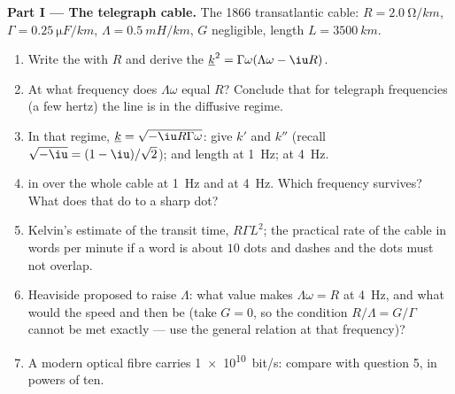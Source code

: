 \begin{problem}
\label{pb:b2:dispersion-wave-packets:1}

\medskip
\noindent\textbf{Part I --- The telegraph cable.}
The 1866 transatlantic cable: $R = \qty{2.0}{\ohm/km}$, $\Gamma = \qty{0.25}{\micro F/km}$,
$\Lambda = \qty{0.5}{mH/km}$, $G$ negligible, length $L = \qty{3500}{km}$.
\begin{enumerate}
  \item Write the  with $R$ and derive the
         $\underline k^2 = \Gamma\omega(\Lambda\omega - \iu R)$.
  \item At what frequency does $\Lambda\omega$ equal $R$? Conclude that for
        telegraph frequencies (a few hertz) the line is in the
        diffusive regime.
  \item In that regime, $\underline k = \sqrt{-\iu R\Gamma\omega}$: give $k'$ and $k''$
        (recall $\sqrt{-\iu} = (1 - \iu)/\sqrt2$);  and
         length at \qty{1}{Hz}; at \qty{4}{Hz}.
  \item {} in  over the whole cable at \qty{1}{Hz} and
        at \qty{4}{Hz}. Which frequency survives? What does that do to a
        sharp dot?
  \item Kelvin's estimate of the transit time, $R\Gamma L^2$; the practical
        rate of the cable in words per minute if a word is about
        $10$ dots and dashes and the dots must not overlap.
  \item Heaviside proposed to raise $\Lambda$: what value makes $\Lambda\omega = R$
        at \qty{4}{Hz}, and what would the speed and  then be
        (take $G = 0$, so the condition $R/\Lambda = G/\Gamma$ cannot be met
        exactly --- use the general relation at that frequency)?
  \item A modern optical fibre carries \qty{1e10}{bit/s}: compare with
        question 5, in powers of ten.
\end{enumerate}


\end{problem}
